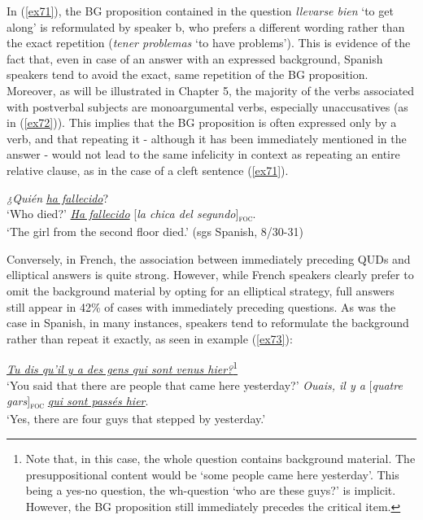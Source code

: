In (\ref{ex71}), the BG proposition contained in the question \textit{llevarse bien} `to get along' is reformulated by speaker b, who prefers a different wording rather than the exact repetition (\textit{tener problemas} `to have problems'). This is evidence of the fact that, even in case of an answer with an expressed background, Spanish speakers tend to avoid the exact, same repetition of the BG proposition.\\
Moreover, as will be illustrated in Chapter 5, the majority of the verbs associated with postverbal subjects are monoargumental verbs, especially unaccusatives (as in (\ref{ex72})). This implies that the BG proposition is often expressed only by a verb, and that repeating it - although it has been immediately mentioned in the answer - would not lead to the same infelicity in context as repeating an entire relative clause, as in the case of a cleft sentence (\ref{ex71}). 

\ea \label{ex72}
\ea	\textit{¿Quién} \uline{\textit{ha fallecido}}?\\
 ‘Who died?'
\ex \uline{\textit{Ha fallecido}} {[\textit{la chica del segundo}]\textsubscript{\textsc{foc}}}\normalsize.\\
‘The girl from the second floor died.' \hfill (sgs Spanish, 8/30-31)  
\z \z


Conversely, in French, the association between immediately preceding QUDs and elliptical answers is quite strong. However, while French speakers clearly prefer to omit the background material by opting for an elliptical strategy, full answers still appear in 42\% of cases with immediately preceding questions. As was the case in Spanish, in many instances, speakers tend to reformulate the background rather than repeat it exactly, as seen in example (\ref{ex73}):

\ea \label{ex73}
\ea \uline{\textit{Tu dis qu'il y a des gens qui sont venus hier?}}\footnote{Note that, in this case, the whole question contains background material. The presuppositional content would be `some people came here yesterday'. This being a yes-no question, the wh-question `who are these guys?' is implicit. However, the BG proposition still immediately precedes the critical item.}\\
 ‘You said that there are people that came here yesterday?'
\ex  \textit{Ouais, il y a} {[\textit{quatre gars}]\textsubscript{\textsc{foc}}} \uline{\textit{qui sont passés hier}}\normalsize.\\
‘Yes, there are four guys that stepped by yesterday.' 

